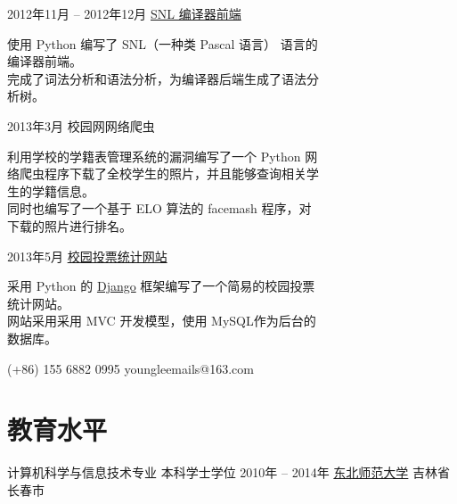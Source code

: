 \documentclass{tccv}
\begin{document}
\begin{eventlist}
\item{\ShiShangZhongHeiJianTi 2012年11月 -- 2012年12月}    %
  {}
  {\href{https://github.com/YoungLeeNENU/A-samll-compiler-frontend}{\VeraSansYuanTi SNL 编译器前端}}
  
  \HiraginoSansGB
  使用 Python 编写了 SNL（一种类 Pascal 语言） 语言的 \\
  编译器前端。 \\
  完成了词法分析和语法分析，为编译器后端生成了语法分 \\
  析树。


\item{\ShiShangZhongHeiJianTi 2013年3月}    %
  {}
  {\VeraSansYuanTi 校园网网络爬虫}

  \HiraginoSansGB  
  利用学校的学籍表管理系统的漏洞编写了一个 Python 网 \\
  络爬虫程序下载了全校学生的照片，并且能够查询相关学 \\
  生的学籍信息。 \\
  同时也编写了一个基于 ELO 算法的 facemash 程序，对 \\
  下载的照片进行排名。


\item{\ShiShangZhongHeiJianTi 2013年5月}    %
  {}
  {\href{https://github.com/YoungLeeNENU/a-vote-website}{\VeraSansYuanTi 校园投票统计网站}}

  \HiraginoSansGB    
  采用 Python 的 \href{https://www.djangoproject.com/}{Django} 框架编写了一个简易的校园投票 \\
  统计网站。\\
  网站采用采用 MVC 开发模型，使用 MySQL作为后台的 \\
  数据库。

\end{eventlist}

{\VeraSansYuanTi (+86) 155 6882 0995}
{\VeraSansYuanTi youngleemails@163.com}

\section{\ShiShangZhongHeiJianTi 教育水平}

\begin{yearlist}

\item[\HiraginoSansGB 计算机科学与信息技术专业 \newline
  本科学士学位]
  {\ShiShangZhongHeiJianTi 2010年 -- 2014年}
  {\href{http://www.nenu.edu.cn/}{\HiraginoSansGB 东北师范大学}}
  {\HiraginoSansGB 吉林省长春市}

\end{yearlist}
\end{document}
